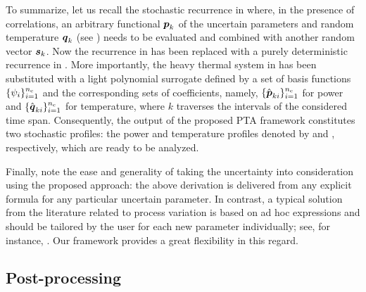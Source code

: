To summarize, let us recall the stochastic recurrence in 
where, in the presence of correlations, an arbitrary functional $\boldsymbol{p}_k$ of the
uncertain parameters \vu and random temperature $\boldsymbol{q}_k$ (see )
needs to be evaluated and combined with another random vector $\boldsymbol{s}_k$. Now the
recurrence in  has been replaced with a purely deterministic
recurrence in . More importantly, the heavy thermal system
in  has been substituted with a light polynomial surrogate
defined by a set of basis functions $\{ \psi_i \}_{i = 1}^{n_\mathrm{c}}$ and the
corresponding sets of coefficients, namely, $\{ \hat{\boldsymbol{p}}_{ki} \}_{i = 1}^{n_\mathrm{c}}$
for power and $\{ \hat{\boldsymbol{q}}_{ki} \}_{i = 1}^{n_\mathrm{c}}$ for temperature, where $k$
traverses the \ns intervals of the considered time span. Consequently, the
output of the proposed PTA framework constitutes two stochastic profiles: the
power and temperature profiles denoted by \mp and \mq, respectively, which are
ready to be analyzed.

Finally, note the ease and generality of taking the uncertainty into
consideration using the proposed approach: the above derivation is delivered
from any explicit formula for any particular uncertain parameter. In contrast, a
typical solution from the literature related to process variation is based on ad
hoc expressions and should be tailored by the user for each new parameter
individually; see, for instance, \cite{huang2009a, bhardwaj2008, ghanta2006}.
Our framework provides a great flexibility in this regard.

\subsection{Post-processing}

